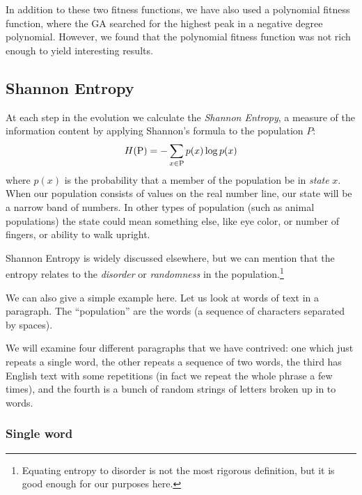 \documentclass[11pt]{article}
\begin{document}
In addition to these two fitness functions, we have also used a
polynomial fitness function, where the GA searched for the highest
peak in a negative degree polynomial. However, we found that the
polynomial fitness function was not rich enough to yield interesting
results.



\subsection{Shannon Entropy}
\label{subsec:shannon-entropy}
At each step in the evolution we calculate the \emph{Shannon Entropy},
a measure of the information content by applying Shannon's formula to
the population $P$:
\begin{equation}
H({\rm P}) = -\sum_{x \in {\rm P}} p(x)\log p(x)
\label{eq:shannon-entropy-def}
\end{equation}
where $p(x)$ is the probability that a member of the population be in
\emph{state} $x$.  When our population consists of values on the real
number line, our state will be a narrow band of numbers.  In other
types of population (such as animal populations) the state could mean
something else, like eye color, or number of fingers, or ability to
walk upright.

Shannon Entropy is widely discussed elsewhere, but we can mention that
the entropy relates to the \emph{disorder} or \emph{randomness} in the
population.\footnote{Equating entropy to disorder is not the most
rigorous definition, but it is good enough for our purposes here.}

We can also give a simple example here.  Let us look at words of text
in a paragraph.  The ``population'' are the words (a sequence of
characters separated by spaces).

We will examine four different paragraphs that we have contrived: one
which just repeats a single word, the other repeats a sequence of two
words, the third has English text with some repetitions (in fact we
repeat the whole phrase a few times), and the fourth is a bunch of
random strings of letters broken up in to words.


\subsubsection{Single word}
\end{document}
